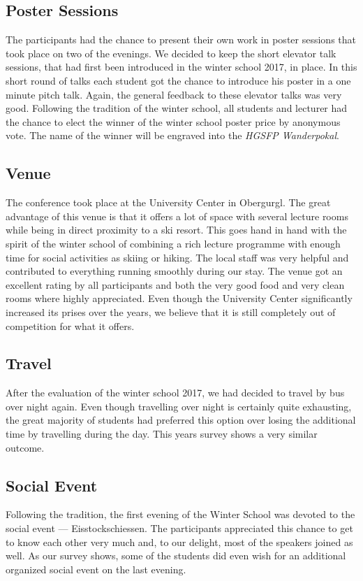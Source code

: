 \subsection*{Poster Sessions}
The participants had the chance to present their own work in poster
sessions that took place on two of the evenings. We decided to keep
the short elevator talk sessions, that had first been introduced in the
winter school 2017, in place. In this short round of talks each student
got the chance to introduce his poster in a one minute pitch talk.
Again, the general feedback to these elevator talks was very good.
Following the tradition of the winter school, all students and lecturer
had the chance to elect the winner of the winter school poster price by
anonymous vote. The name of the winner will be engraved into the \textit{HGSFP
Wanderpokal}.

\subsection*{Venue}
The conference took place at the University Center in Obergurgl. The
great advantage of this venue is that it offers a lot of space with
several lecture rooms while being in direct proximity to a ski resort.
This goes hand in hand with the spirit of the winter school of combining
a rich lecture programme with enough time for social activities as
skiing or hiking. The local staff was very helpful and contributed to
everything running smoothly during our stay. The venue got an excellent
rating by all participants and both the very good food and very clean
rooms where highly appreciated. Even though the University Center
significantly increased its prises over the years, we believe that it is
still completely out of competition for what it offers.


\subsection*{Travel}
After the evaluation of the winter school 2017, we had decided to travel
by bus over night again. Even though travelling over night is
certainly quite exhausting, the great majority of students had preferred
this option over losing the additional time by travelling during the
day. This years survey shows a very similar outcome.

\subsection*{Social Event}
Following the tradition, the first evening of the Winter School was
devoted to the social event — Eisstockschiessen. The participants
appreciated this chance to get to know each other very
much and, to our delight, most of the speakers joined as well. As our
survey shows, some of the students did even wish for an additional
organized social event on the last evening.

